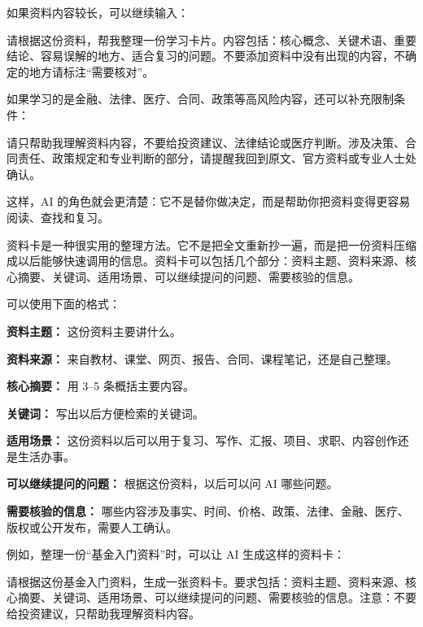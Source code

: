 如果资料内容较长，可以继续输入：

\begin{tcolorbox}[promptbox]
请根据这份资料，帮我整理一份学习卡片。内容包括：核心概念、关键术语、重要结论、容易误解的地方、适合复习的问题。不要添加资料中没有出现的内容，不确定的地方请标注“需要核对”。
\end{tcolorbox}

如果学习的是金融、法律、医疗、合同、政策等高风险内容，还可以补充限制条件：

\begin{tcolorbox}[promptbox]
请只帮助我理解资料内容，不要给投资建议、法律结论或医疗判断。涉及决策、合同责任、政策规定和专业判断的部分，请提醒我回到原文、官方资料或专业人士处确认。
\end{tcolorbox}

这样，AI 的角色就会更清楚：它不是替你做决定，而是帮助你把资料变得更容易阅读、查找和复习。


资料卡是一种很实用的整理方法。它不是把全文重新抄一遍，而是把一份资料压缩成以后能够快速调用的信息。资料卡可以包括几个部分：资料主题、资料来源、核心摘要、关键词、适用场景、可以继续提问的问题、需要核验的信息。

可以使用下面的格式：

\begin{tcolorbox}[skillbox,title=资料卡模板]
\textbf{资料主题：} 这份资料主要讲什么。

\textbf{资料来源：} 来自教材、课堂、网页、报告、合同、课程笔记，还是自己整理。

\textbf{核心摘要：} 用 3--5 条概括主要内容。

\textbf{关键词：} 写出以后方便检索的关键词。

\textbf{适用场景：} 这份资料以后可以用于复习、写作、汇报、项目、求职、内容创作还是生活办事。

\textbf{可以继续提问的问题：} 根据这份资料，以后可以问 AI 哪些问题。

\textbf{需要核验的信息：} 哪些内容涉及事实、时间、价格、政策、法律、金融、医疗、版权或公开发布，需要人工确认。
\end{tcolorbox}

例如，整理一份“基金入门资料”时，可以让 AI 生成这样的资料卡：

\begin{tcolorbox}[promptbox]
请根据这份基金入门资料，生成一张资料卡。要求包括：资料主题、资料来源、核心摘要、关键词、适用场景、可以继续提问的问题、需要核验的信息。注意：不要给投资建议，只帮助我理解资料内容。
\end{tcolorbox}

